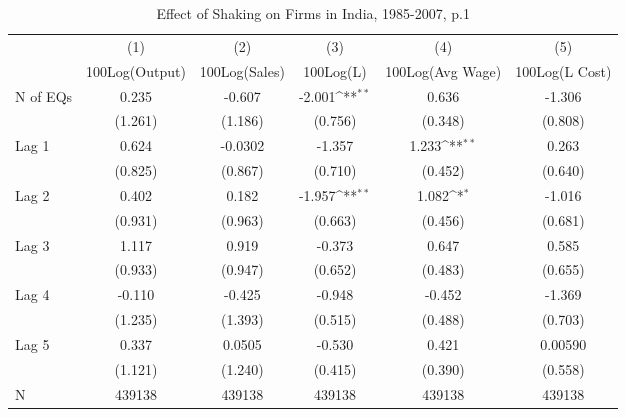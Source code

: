 \begin{table}[htbp]\centering
\def\sym#1{\ifmmode^{#1}\else\(^{#1}\)\fi}
\caption{Effect of Shaking on Firms in India, 1985-2007, p.1}
\begin{tabular}{l*{5}{c}}
\toprule
                &\multicolumn{1}{c}{(1)}&\multicolumn{1}{c}{(2)}&\multicolumn{1}{c}{(3)}&\multicolumn{1}{c}{(4)}&\multicolumn{1}{c}{(5)}\\
                &\multicolumn{1}{c}{100Log(Output)}&\multicolumn{1}{c}{100Log(Sales)}&\multicolumn{1}{c}{100Log(L)}&\multicolumn{1}{c}{100Log(Avg Wage)}&\multicolumn{1}{c}{100Log(L Cost)}\\
\midrule
N of EQs        &    0.235         &   -0.607         &   -2.001\sym{**} &    0.636         &   -1.306         \\
                &  (1.261)         &  (1.186)         &  (0.756)         &  (0.348)         &  (0.808)         \\
\addlinespace
Lag 1           &    0.624         &  -0.0302         &   -1.357         &    1.233\sym{**} &    0.263         \\
                &  (0.825)         &  (0.867)         &  (0.710)         &  (0.452)         &  (0.640)         \\
\addlinespace
Lag 2           &    0.402         &    0.182         &   -1.957\sym{**} &    1.082\sym{*}  &   -1.016         \\
                &  (0.931)         &  (0.963)         &  (0.663)         &  (0.456)         &  (0.681)         \\
\addlinespace
Lag 3           &    1.117         &    0.919         &   -0.373         &    0.647         &    0.585         \\
                &  (0.933)         &  (0.947)         &  (0.652)         &  (0.483)         &  (0.655)         \\
\addlinespace
Lag 4           &   -0.110         &   -0.425         &   -0.948         &   -0.452         &   -1.369         \\
                &  (1.235)         &  (1.393)         &  (0.515)         &  (0.488)         &  (0.703)         \\
\addlinespace
Lag 5           &    0.337         &   0.0505         &   -0.530         &    0.421         &  0.00590         \\
                &  (1.121)         &  (1.240)         &  (0.415)         &  (0.390)         &  (0.558)         \\
\midrule
N               &   439138         &   439138         &   439138         &   439138         &   439138         \\

\end{tabular}
\end{table}
